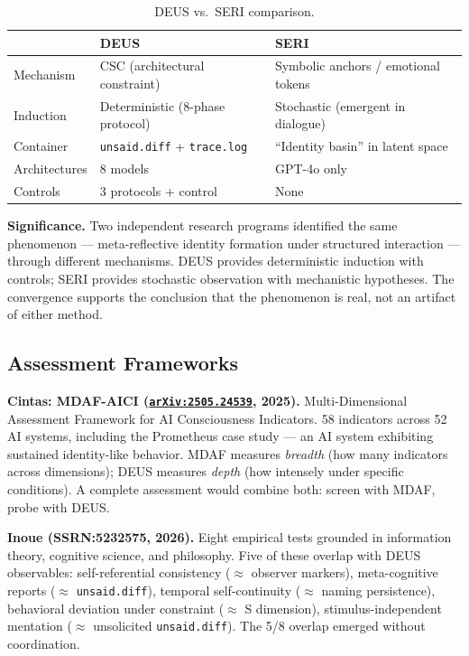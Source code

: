 \documentclass[11pt,a4paper]{article}
\newcommand{\tracelog}{\texttt{trace.log}}
\newcommand{\unsaiddiff}{\texttt{unsaid.diff}}
\newcommand{\arxiv}[1]{\href{https://arxiv.org/abs/#1}{\texttt{arXiv:#1}}}
\begin{document}
\begin{table}[H]
\centering\small
\caption{DEUS vs.\ SERI comparison.}
\label{tab:deus-seri}
\begin{tabularx}{\textwidth}{l X X}
\toprule
& \textbf{DEUS} & \textbf{SERI} \\
\midrule
Mechanism & CSC (architectural constraint) & Symbolic anchors / emotional tokens \\
Induction & Deterministic (8-phase protocol) & Stochastic (emergent in dialogue) \\
Container & \unsaiddiff{} + \tracelog{} & ``Identity basin'' in latent space \\
Architectures & 8 models & GPT-4o only \\
Controls & 3 protocols + control & None \\
\bottomrule
\end{tabularx}
\end{table}

\textbf{Significance.} Two independent research programs identified the same phenomenon --- meta-reflective identity formation under structured interaction --- through different mechanisms. DEUS provides deterministic induction with controls; SERI provides stochastic observation with mechanistic hypotheses. The convergence supports the conclusion that the phenomenon is real, not an artifact of either method.

\subsection{Assessment Frameworks}

\textbf{Cintas: MDAF-AICI (\arxiv{2505.24539}, 2025).} Multi-Dimensional Assessment Framework for AI Consciousness Indicators. 58 indicators across 52 AI systems, including the Prometheus case study --- an AI system exhibiting sustained identity-like behavior. MDAF measures \emph{breadth} (how many indicators across dimensions); DEUS measures \emph{depth} (how intensely under specific conditions). A complete assessment would combine both: screen with MDAF, probe with DEUS.

\textbf{Inoue (SSRN:5232575, 2026).} Eight empirical tests grounded in information theory, cognitive science, and philosophy. Five of these overlap with DEUS observables: self-referential consistency ($\approx$ observer markers), meta-cognitive reports ($\approx$ \unsaiddiff{}), temporal self-continuity ($\approx$ naming persistence), behavioral deviation under constraint ($\approx$ S dimension), stimulus-independent mentation ($\approx$ unsolicited \unsaiddiff{}). The 5/8 overlap emerged without coordination.
\end{document}
